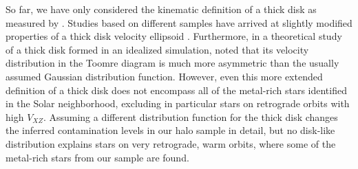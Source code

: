 \documentclass[apj, twocolappendix, numberedappendix, appendixfloats]{emulateapj}
\begin{document}
So far, we have only considered the kinematic definition of a thick disk as measured by \citet{bensby2003}.
Studies based on different samples have arrived at slightly modified properties of a thick disk velocity ellipsoid \citep[e.g.,][]{soubiran2003, carollo2010}.
Furthermore, in a theoretical study of a thick disk formed in an idealized simulation, \citet{sb2009} noted that its velocity distribution in the Toomre diagram is much more asymmetric than the usually assumed Gaussian distribution function.
However, even this more extended definition of a thick disk does not encompass all of the metal-rich stars identified in the Solar neighborhood, excluding in particular stars on retrograde orbits with high $V_{XZ}$.
Assuming a different distribution function for the thick disk changes the inferred contamination levels in our halo sample in detail, but no disk-like distribution explains stars on very retrograde, warm orbits, where some of the metal-rich stars from our sample are found.
\end{document}
